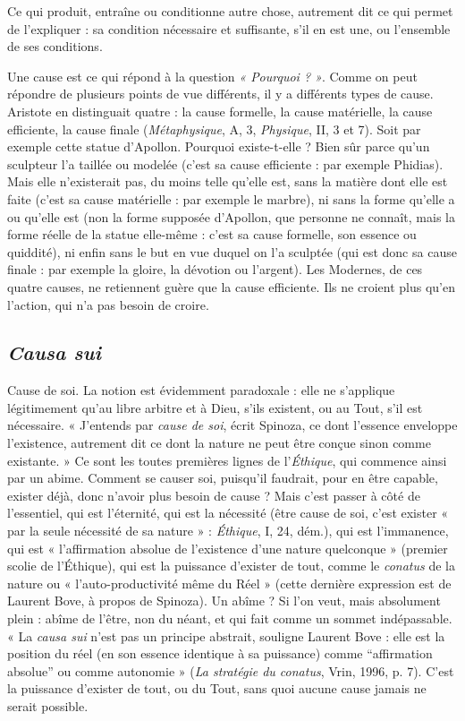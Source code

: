 Ce qui produit, entraîne ou conditionne autre chose, autrement dit
ce qui permet de l'expliquer : sa condition nécessaire et suffisante,
s’il en est une, ou l’ensemble de ses conditions.

Une cause est ce qui répond à la question {\it « Pourquoi ? »}. Comme on peut
répondre de plusieurs points de vue différents, il y a différents types de cause.
Aristote en distinguait quatre : la cause formelle, la cause matérielle, la cause
efficiente, la cause finale ({\it Métaphysique}, A, 3, {\it Physique}, II, 3 et 7). Soit par
exemple cette statue d’Apollon. Pourquoi existe-t-elle ? Bien sûr parce qu’un
sculpteur l’a taillée ou modelée (c’est sa cause efficiente : par exemple Phidias).
Mais elle n’existerait pas, du moins telle qu’elle est, sans la matière dont elle est
faite (c’est sa cause matérielle : par exemple le marbre), ni sans la forme qu’elle
a ou qu’elle est (non la forme supposée d’Apollon, que personne ne connaît,
mais la forme réelle de la statue elle-même : c’est sa cause formelle, son essence
ou quiddité), ni enfin sans le but en vue duquel on l’a sculptée (qui est donc sa
cause finale : par exemple la gloire, la dévotion ou l’argent). Les Modernes, de
ces quatre causes, ne retiennent guère que la cause efficiente. Ils ne croient plus
qu’en l’action, qui n’a pas besoin de croire.

\subsection{{\it Causa sui}}

Cause de soi. La notion est évidemment paradoxale : elle ne
s'applique légitimement qu’au libre arbitre et à Dieu, s’ils existent,
ou au Tout, s’il est nécessaire. « J'entends par {\it cause de soi}, écrit Spinoza,
ce dont l’essence enveloppe l'existence, autrement dit ce dont la nature ne peut
être conçue sinon comme existante. » Ce sont les toutes premières lignes de
l’{\it Éthique}, qui commence ainsi par un abime. Comment se causer soi, puisqu'il
faudrait, pour en être capable, exister déjà, donc n’avoir plus besoin de cause ?
Mais c’est passer à côté de l'essentiel, qui est l’éternité, qui est la nécessité (être
cause de soi, c’est exister « par la seule nécessité de sa nature » : {\it Éthique}, I, 24,
dém.), qui est l’immanence, qui est « l'affirmation absolue de l’existence d’une
nature quelconque » (premier scolie de l’Éthique), qui est la puissance d’exister
de tout, comme le {\it conatus} de la nature ou « l’auto-productivité même du Réel »
(cette dernière expression est de Laurent Bove, à propos de Spinoza). Un
abîme ? Si l’on veut, mais absolument plein : abîme de l'être, non du néant, et
qui fait comme un sommet indépassable. « La {\it causa sui} n’est pas un principe
abstrait, souligne Laurent Bove : elle est la position du réel (en son essence
identique à sa puissance) comme “affirmation absolue” ou comme autonomie »
({\it La stratégie du conatus}, Vrin, 1996, p. 7). C’est la puissance d’exister de tout,
ou du Tout, sans quoi aucune cause jamais ne serait possible.

